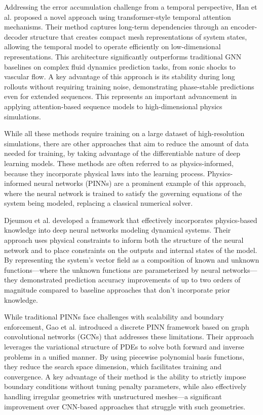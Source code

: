 Addressing the error accumulation challenge from a temporal perspective, Han et al. \cite{hanPredictingPhysicsMeshreduced2022a} proposed a novel approach using transformer-style temporal attention mechanisms. Their method captures long-term dependencies through an encoder-decoder structure that creates compact mesh representations of system states, allowing the temporal model to operate efficiently on low-dimensional representations. This architecture significantly outperforms traditional GNN baselines on complex fluid dynamics prediction tasks, from sonic shocks to vascular flow. A key advantage of this approach is its stability during long rollouts without requiring training noise, demonstrating phase-stable predictions even for extended sequences. This represents an important advancement in applying attention-based sequence models to high-dimensional physics simulations.

While all these methods require training on a large dataset of high-resolution simulations, there are other approaches that aim to reduce the amount of data needed for training, by taking advantage of the differentiable nature of deep learning models. These methods are often referred to as physics-informed, because they incorporate physical laws into the learning process. Physics-informed neural networks (PINNs) are a prominent example of this approach, where the neural network is trained to satisfy the governing equations of the system being modeled, replacing a classical numerical solver. 

Djeumou et al. \cite{djeumouNeuralNetworksPhysicsInformed2022} developed a framework that effectively incorporates physics-based knowledge into deep neural networks modeling dynamical systems. Their approach uses physical constraints to inform both the structure of the neural network and to place constraints on the outputs and internal states of the model. By representing the system's vector field as a composition of known and unknown functions—where the unknown functions are parameterized by neural networks—they demonstrated prediction accuracy improvements of up to two orders of magnitude compared to baseline approaches that don't incorporate prior knowledge.

While traditional PINNs face challenges with scalability and boundary enforcement, Gao et al. \cite{gaoPhysicsinformedGraphNeural2022} introduced a discrete PINN framework based on graph convolutional networks (GCNs) that addresses these limitations. Their approach leverages the variational structure of PDEs to solve both forward and inverse problems in a unified manner. By using piecewise polynomial basis functions, they reduce the search space dimension, which facilitates training and convergence. A key advantage of their method is the ability to strictly impose boundary conditions without tuning penalty parameters, while also effectively handling irregular geometries with unstructured meshes—a significant improvement over CNN-based approaches that struggle with such geometries.

